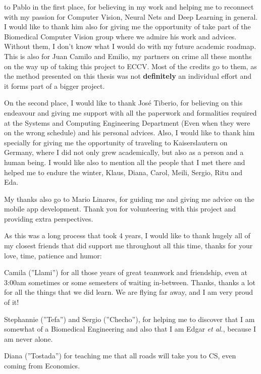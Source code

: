 
 to Pablo in the first place, for believing in my work and helping me to reconnect with my passion for Computer Vision, Neural Nets and Deep Learning in general. I would like to thank him also for giving me the opportunity of take part of the Biomedical Computer Vision group where we admire his work and advices. Without them, I don't know what I would do with my future academic roadmap. This is also for Juan Camilo and Emilio, my partners on crime all these months on the way up of taking this project to ECCV. Most of the credits go to them, as the method presented on this thesis was not \textbf{definitely} an individual effort and it forms part of a bigger project.

On the second place, I would like to thank José Tiberio, for believing on this endeavour and giving me support with all the paperwork and formalities required at the Systems and Computing Engineering Department (Even when they were on the wrong schedule) and his personal advices. Also, I would like to thank him specially for giving me the opportunity of traveling to Kaiserslautern on Germany, where I did not only grew academically, but also as a person and a human being. I would like also to mention all the people that I met there and helped me to endure the winter, Klaus, Diana, Carol, Meili, Sergio, Ritu and Eda.

My thanks also go to Mario Linares, for guiding me and giving me advice on the mobile app development. Thank you for volunteering with this project and providing extra perspectives.

As this was a long process that took 4 years, I would like to thank hugely all of my closest friends that did support me throughout all this time, thanks for your love, time, patience and humor: 

Camila (''Llami'') for all those years of great teamwork and friendship, even at 3:00am sometimes or some semesters of waiting in-between. Thanks, thanks a lot for all the things that we did learn. We are flying far away, and I am very proud of it!

Stephannie (''Tefa'') and Sergio (''Checho''), for helping me to discover that I am somewhat of a Biomedical Engineering and also that I am Edgar \textit{et al.}, because I am never alone.

Diana (''Tostada'') for teaching me that all roads will take you to CS, even coming from Economics.

